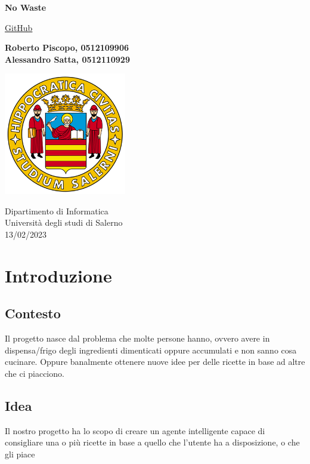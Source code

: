 \documentclass[12pt]{report}
\begin{document}
\begin{titlepage}
   \begin{center}
       \vspace*{5cm}

       \textbf{\huge{No Waste}}

       \vspace{0.5cm}
        \href{https://github.com/UniRoby/Recipe_Suggester_RSAI}{GitHub}
            
       \vspace{1.5cm}

       \textbf{Roberto Piscopo, 0512109906  \\ Alessandro Satta, 0512110929}

       \vfill

       \includegraphics[width=0.4\textwidth]{img/logo.png}
            
       Dipartimento di Informatica\\
       Università degli studi di Salerno\\
       13/02/2023         
   \end{center}
\end{titlepage}

\tableofcontents

\chapter{Introduzione}
\section{Contesto}    
Il progetto nasce dal problema che molte persone hanno, ovvero avere in dispensa/frigo degli ingredienti dimenticati oppure accumulati e non sanno cosa cucinare. Oppure banalmente ottenere nuove idee per delle ricette in base ad altre che ci piacciono.

\section{Idea}
Il nostro progetto ha lo scopo di creare un agente intelligente capace di consigliare una o più ricette in base a quello che l’utente ha a disposizione, o che gli piace 
\end{document}
